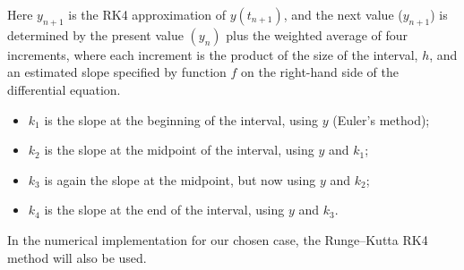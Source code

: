 \documentclass  [
  paper    = a4,
  BCOR     = 10mm,
  twoside,
  fontsize = 12pt,
  fleqn,
  toc      = bibnumbered,
  toc      = listofnumbered,
  numbers  = noendperiod,
  headings = normal,
  listof   = leveldown,
  version  = 3.03
]                                       {scrreprt}
\newcommand{\<}{\langle}
\renewcommand{\>}{\rangle}
\begin{document}
Here $y_{n+1}$ is the RK4 approximation of $y(t_{n+1})$, and the next value ($y_{n+1}$) is determined by the present value $(y_n)$ plus the weighted average of four increments, where each increment is the product of the size of the interval, $h$, and an estimated slope specified by function $f$ on the right-hand side of the differential equation.
\begin{itemize}
\item  $k_1$ is the slope at the beginning of the interval, using $y$  (Euler's method);
\item  $k_2$ is the slope at the midpoint of the interval, using $y$ and $k_1$;
\item  $k_3$ is again the slope at the midpoint, but now using $y$ and $k_2$;
\item $k_4$ is the slope at the end of the interval, using $y$ and $k_3$.
\end{itemize}

In the numerical implementation for our chosen case, the Runge–Kutta RK4 method will also be used.  
\end{document}
